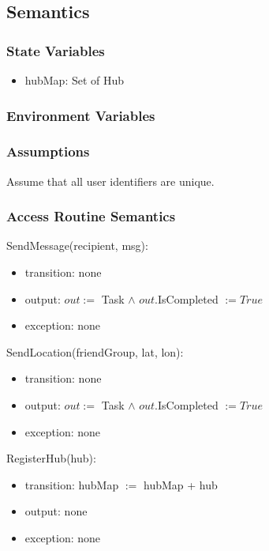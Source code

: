 \documentclass[12pt, titlepage]{article}
\begin{document}
\subsection{Semantics}

\subsubsection{State Variables}
\begin{itemize}
\item hubMap: Set of Hub
\end{itemize}

\subsubsection{Environment Variables}

\subsubsection{Assumptions}

Assume that all user identifiers are unique.

\subsubsection{Access Routine Semantics}

\noindent SendMessage(recipient, msg):
\begin{itemize}
\item transition: none
\item output: $out :=$ Task $\land$ $out$.IsCompleted $:= True$
\item exception: none
\end{itemize}

\noindent SendLocation(friendGroup, lat, lon):
\begin{itemize}
\item transition: none
\item output: $out :=$ Task $\land$ $out$.IsCompleted $:= True$
\item exception: none
\end{itemize}

\noindent RegisterHub(hub):
\begin{itemize}
\item transition: hubMap $:=$ hubMap + hub
\item output: none
\item exception: none
\end{itemize}
\end{document}
